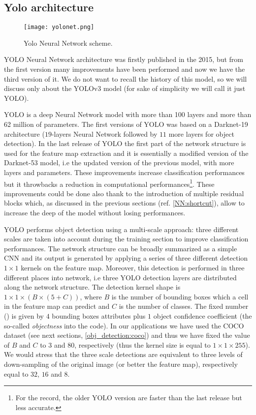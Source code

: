\documentclass{standalone}
\begin{document}
\subsection[Yolo]{Yolo architecture}\label{obj_detection:yolo}

\begin{center}
\begin{figure}[htbp]
\centering
\texttt{[image: yolonet.png]}
\caption{Yolo Neural Network scheme.
}
\label{fig:yolo}
\end{figure}
\end{center}

YOLO Neural Network architecture was firstly published in the 2015, but from the first version many improvements have been performed and now we have the third version of it.
We do not want to recall the history of this model, so we will discuss only about the YOLOv3 model (for sake of simplicity we will call it just YOLO).

YOLO is a deep Neural Network model with more than 100 layers and more than 62 million of parameters.
The first versions of YOLO was based on a Darknet-19 architecture ($19$-layers Neural Network followed by $11$ more layers for object detection).
In the last release of YOLO the first part of the network structure is used for the feature map extraction and it is essentially a modified version of the Darknet-53 model, i.e the updated version of the previous model, with more layers and parameters.
These improvements increase classification performances but it throwbacks a reduction in computational performances\footnote{
  For the record, the older YOLO version are faster than the last release but less accurate.
}.
These improvements could be done also thank to the introduction of multiple residual blocks which, as discussed in the previous sections (ref. \ref{NN:shortcut}), allow to increase the deep of the model without losing performances.

YOLO performs object detection using a multi-scale approach: three different scales are taken into account during the training section to improve classification performances.
The network structure can be broadly summarized as a simple CNN and its output is generated by applying a series of three different detection $1\times1$ kernels on the feature map.
Moreover, this detection is performed in three different places into network, i.e three YOLO detection layers are distributed along the network structure.
The detection kernel shape is $1\times1\times(B\times(5 + C))$, where $B$ is the number of bounding boxes which a cell in the feature map can predict and $C$ is the number of classes.
The fixed number () is given by $4$ bounding boxes attributes plus $1$ object confidence coefficient (the so-called \emph{objectness} into the code).
In our applications we have used the COCO dataset (see next sections, \ref{obj_detection:coco}) and thus we have fixed the value of $B$ and $C$ to $3$ and $80$, respectively (thus the kernel size is equal to $1\times1\times255$).
We would stress that the three scale detections are equivalent to three levels of down-sampling of the original image (or better the feature map), respectively equal to $32$, $16$ and $8$.
\end{document}
